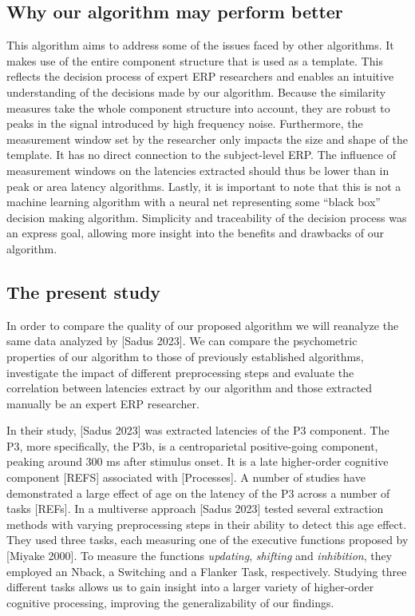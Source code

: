 \documentclass[
  man,floatsintext]{apa7}
\begin{document}
\hypertarget{why-our-algorithm-may-perform-better}{%
\subsection{Why our algorithm may perform better}\label{why-our-algorithm-may-perform-better}}

This algorithm aims to address some of the issues faced by other algorithms. It makes use of the entire component structure that is used as a template. This reflects the decision process of expert ERP researchers and enables an intuitive understanding of the decisions made by our algorithm. Because the similarity measures take the whole component structure into account, they are robust to peaks in the signal introduced by high frequency noise. Furthermore, the measurement window set by the researcher only impacts the size and shape of the template. It has no direct connection to the subject-level ERP. The influence of measurement windows on the latencies extracted should thus be lower than in peak or area latency algorithms. Lastly, it is important to note that this is not a machine learning algorithm with a neural net representing some ``black box'' decision making algorithm. Simplicity and traceability of the decision process was an express goal, allowing more insight into the benefits and drawbacks of our algorithm.

\hypertarget{the-present-study}{%
\subsection{The present study}\label{the-present-study}}

In order to compare the quality of our proposed algorithm we will reanalyze the same data analyzed by {[}Sadus 2023{]}. We can compare the psychometric properties of our algorithm to those of previously established algorithms, investigate the impact of different preprocessing steps and evaluate the correlation between latencies extract by our algorithm and those extracted manually be an expert ERP researcher.

In their study, {[}Sadus 2023{]} was extracted latencies of the P3 component. The P3, more specifically, the P3b, is a centroparietal positive-going component, peaking around 300 ms after stimulus onset. It is a late higher-order cognitive component {[}REFS{]} associated with {[}Processes{]}. A number of studies have demonstrated a large effect of age on the latency of the P3 across a number of tasks {[}REFs{]}. In a multiverse approach {[}Sadus 2023{]} tested several extraction methods with varying preprocessing steps in their ability to detect this age effect. They used three tasks, each measuring one of the executive functions proposed by {[}Miyake 2000{]}. To measure the functions \emph{updating}, \emph{shifting} and \emph{inhibition}, they employed an Nback, a Switching and a Flanker Task, respectively. Studying three different tasks allows us to gain insight into a larger variety of higher-order cognitive processing, improving the generalizability of our findings.
\end{document}
